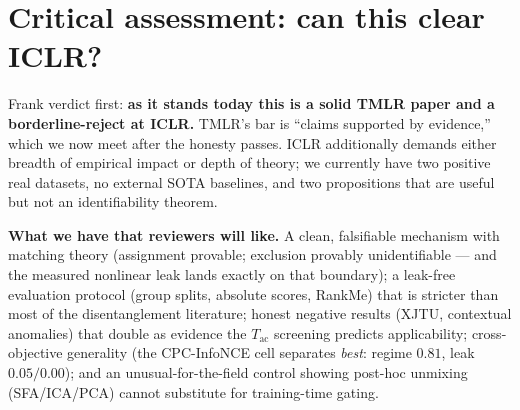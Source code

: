 \documentclass[10pt]{article}
\begin{document}
\section{Critical assessment: can this clear ICLR?}
Frank verdict first: \textbf{as it stands today this is a solid TMLR paper
and a borderline-reject at ICLR.} TMLR's bar is ``claims supported by
evidence,'' which we now meet after the honesty passes. ICLR additionally
demands either breadth of empirical impact or depth of theory; we currently
have two positive real datasets, no external SOTA baselines, and two
propositions that are useful but not an identifiability theorem.

\textbf{What we have that reviewers will like.} A clean, falsifiable
mechanism with matching theory (assignment provable; exclusion provably
unidentifiable --- and the measured nonlinear leak lands exactly on that
boundary); a leak-free evaluation protocol (group splits, absolute scores,
RankMe) that is stricter than most of the disentanglement literature; honest
negative results (XJTU, contextual anomalies) that double as evidence the
$T_{\mathrm{ac}}$ screening predicts applicability; cross-objective
generality (the CPC-InfoNCE cell separates \emph{best}: regime $0.81$, leak
$0.05/0.00$); and an unusual-for-the-field control showing post-hoc unmixing
(SFA/ICA/PCA) cannot substitute for training-time gating.
\end{document}
